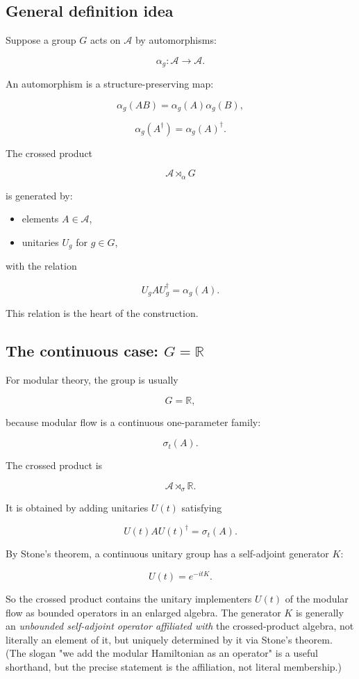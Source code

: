 \documentclass[11pt,a4paper]{article}
\begin{document}
\subsection{General definition idea}

Suppose a group $G$ acts on $\mathcal{A}$ by automorphisms:

\[
\alpha_g:\mathcal{A}\to\mathcal{A}.
\]

An automorphism is a structure-preserving map:

\[
\alpha_g(AB)=\alpha_g(A)\alpha_g(B),
\]

\[
\alpha_g(A^\dagger)=\alpha_g(A)^\dagger.
\]

The crossed product

\[
\mathcal{A}\rtimes_\alpha G
\]

is generated by:

\begin{itemize}
  \item elements $A\in\mathcal{A}$,
  \item unitaries $U_g$ for $g\in G$,
\end{itemize}

with the relation

\[
U_g A U_g^\dagger=\alpha_g(A).
\]

This relation is the heart of the construction.

\subsection{The continuous case: $G=\mathbb{R}$}

For modular theory, the group is usually

\[
G=\mathbb{R},
\]

because modular flow is a continuous one-parameter family:

\[
\sigma_t(A).
\]

The crossed product is

\[
\mathcal{A}\rtimes_\sigma \mathbb{R}.
\]

It is obtained by adding unitaries $U(t)$ satisfying

\[
U(t) A U(t)^\dagger = \sigma_t(A).
\]

By Stone’s theorem, a continuous unitary group has a self-adjoint generator $K$:

\[
U(t)=e^{-itK}.
\]

So the crossed product contains the unitary implementers $U(t)$ of the modular flow as bounded operators in an enlarged algebra. The generator $K$ is generally an \emph{unbounded self-adjoint operator affiliated with} the crossed-product algebra, not literally an element of it, but uniquely determined by it via Stone's theorem. (The slogan "we add the modular Hamiltonian as an operator" is a useful shorthand, but the precise statement is the affiliation, not literal membership.)
\end{document}
